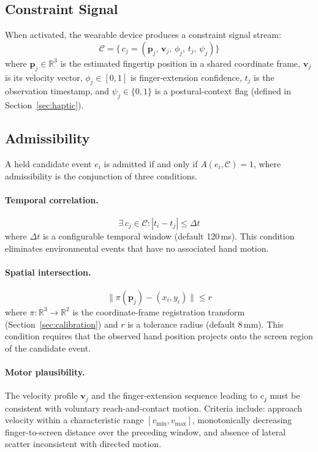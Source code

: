 \documentclass[11pt,letterpaper]{article}
\begin{document}
\subsection{Constraint Signal}

When activated, the wearable device produces a constraint signal stream:
\[
  \mathcal{C} = \bigl\{\, c_j = (\mathbf{p}_j,\, \mathbf{v}_j,\, \phi_j,\,
  t_j,\, \psi_j) \bigr\}
\]
where $\mathbf{p}_j \in \mathbb{R}^3$ is the estimated fingertip position in a
shared coordinate frame, $\mathbf{v}_j$ is its velocity vector, $\phi_j \in [0,1]$
is finger-extension confidence, $t_j$ is the observation timestamp, and $\psi_j
\in \{0,1\}$ is a postural-context flag (defined in Section~\ref{sec:haptic}).

\subsection{Admissibility}

A held candidate event $e_i$ is admitted if and only if $A(e_i, \mathcal{C}) = 1$,
where admissibility is the conjunction of three conditions.

\paragraph{Temporal correlation.}
\[
  \exists\, c_j \in \mathcal{C} : |t_i - t_j| \leq \Delta t
\]
where $\Delta t$ is a configurable temporal window (default 120\,ms). This
condition eliminates environmental events that have no associated hand motion.

\paragraph{Spatial intersection.}
\[
  \bigl\| \pi(\mathbf{p}_j) - (x_i, y_i) \bigr\| \leq r
\]
where $\pi : \mathbb{R}^3 \to \mathbb{R}^2$ is the coordinate-frame registration
transform (Section~\ref{sec:calibration}) and $r$ is a tolerance radius (default
8\,mm). This condition requires that the observed hand position projects onto the
screen region of the candidate event.

\paragraph{Motor plausibility.}
The velocity profile $\mathbf{v}_j$ and the finger-extension sequence leading to
$c_j$ must be consistent with voluntary reach-and-contact motion. Criteria include:
approach velocity within a characteristic range $[v_{\min}, v_{\max}]$,
monotonically decreasing finger-to-screen distance over the preceding window, and
absence of lateral scatter inconsistent with directed motion.
\end{document}

